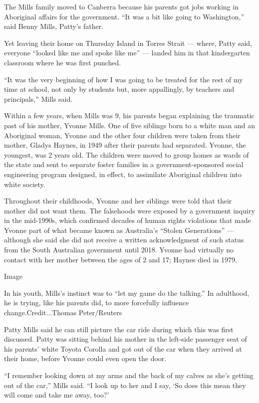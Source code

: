 The Mills family moved to Canberra because his parents got jobs working
in Aboriginal affairs for the government. ``It was a bit like going to
Washington,'' said Benny Mills, Patty's father.

Yet leaving their home on Thursday Island in Torres Strait --- where,
Patty said, everyone ``looked like me and spoke like me'' --- landed him
in that kindergarten classroom where he was first punched.

``It was the very beginning of how I was going to be treated for the
rest of my time at school, not only by students but, more appallingly,
by teachers and principals,'' Mills said.

Within a few years, when Mills was 9, his parents began explaining the
traumatic past of his mother, Yvonne Mills. One of five siblings born to
a white man and an Aboriginal woman, Yvonne and the other four children
were taken from their mother, Gladys Haynes, in 1949 after their parents
had separated. Yvonne, the youngest, was 2 years old. The children were
moved to group homes as wards of the state and sent to separate foster
families in a government-sponsored social engineering program designed,
in effect, to assimilate Aboriginal children into white society.

Throughout their childhoods, Yvonne and her siblings were told that
their mother did not want them. The falsehoods were exposed by a
government inquiry in the mid-1990s, which confirmed decades of human
rights violations that made Yvonne part of what became known as
Australia's ``Stolen Generations'' --- although she said she did not
receive a written acknowledgment of such status from the South
Australian government until 2018. Yvonne had virtually no contact with
her mother between the ages of 2 and 17; Haynes died in 1979.

Image

In his youth, Mills's instinct was to ``let my game do the talking.'' In
adulthood, he is trying, like his parents did, to more forcefully
influence change.Credit...Thomas Peter/Reuters

Patty Mills said he can still picture the car ride during which this was
first discussed. Patty was sitting behind his mother in the left-side
passenger seat of his parents' white Toyota Corolla and got out of the
car when they arrived at their home, before Yvonne could even open the
door.

``I remember looking down at my arms and the back of my calves as she's
getting out of the car,'' Mills said. ``I look up to her and I say, `So
does this mean they will come and take me away, too?'

